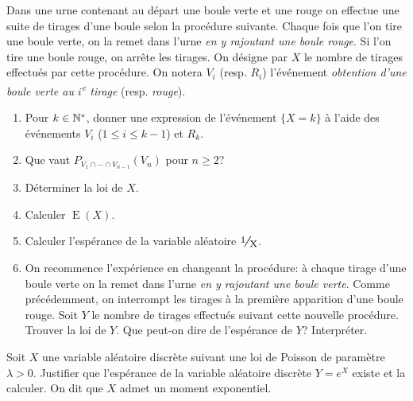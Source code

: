 \documentclass[a4paper,12pt,reqno]{amsart}
\DeclareMathOperator{\E}{E}
\begin{document}
\begin{exo}

  Dans une urne contenant au départ une boule verte et une rouge on effectue une suite de tirages d'une boule selon la procédure suivante. Chaque fois que l'on tire une boule verte, on la remet dans l'urne \emph{en y rajoutant une boule rouge}. Si l'on tire une boule rouge, on arrête les tirages. On désigne par $X$ le nombre de tirages effectués par cette procédure. On notera $V_i$ (resp. $R_i$) l'événement \emph{obtention d'une boule verte au $i$\textsuperscript{e} tirage} (resp. \emph{rouge}).

  \begin{enumerate}
    \item Pour $k\in\mathbb{N}^{\ast}$, donner une expression de l'événement $\{X=k\}$ à l'aide des événements $V_i$ ($1\leq i\leq k-1$) et $R_k$.
    \item Que vaut $P_{V_1\cap\cdots\cap V_{n-1}}(V_n)$ pour $n\geq 2$?
    \item Déterminer la loi de $X$.
    \item Calculer $\E(X)$.
    \item Calculer l'espérance de la variable aléatoire $\dsfrac{1}{X}$.
    \item On recommence l'expérience en changeant la procédure: à chaque tirage d'une boule verte on la remet dans l'urne \emph{en y rajoutant une boule verte}. Comme précédemment, on interrompt les tirages à la première apparition d'une boule rouge. Soit $Y$ le nombre de tirages effectués suivant cette nouvelle procédure. Trouver la loi de $Y$. Que peut-on dire de l'espérance de $Y$? Interpréter.
  \end{enumerate}

\end{exo}

\begin{exo}

  Soit $X$ une variable aléatoire discrète suivant une loi de Poisson de paramètre $\lambda>0$. Justifier que l'espérance de la variable aléatoire discrète $Y=e^X$ existe  et la calculer. On dit que $X$ admet un moment exponentiel.

\end{exo}
\end{document}
